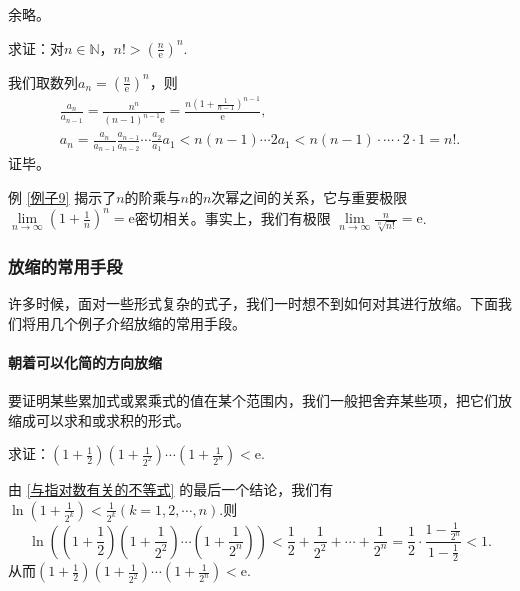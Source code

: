 \begin{itemize}
\begin{prove}
              余略。
          \end{prove}


          \begin{example}
              求证：对$n\in \mathbb{N}$，$n!>\left (\frac{n}{\mathrm e} \right )^n$.\label{例子9}
          \end{example}
          \begin{prove}
              我们取数列$a_n=\left (\frac{n}{\mathrm e} \right )^n$，则
              \begin{gather}
                  \frac{a_n}{a_{n-1}}=\frac{n^n}{(n-1)^{n-1}\mathrm e}=\frac{n\left (1+\frac{1}{n-1}\right )^{n-1}}{\mathrm e},\\
                  a_n=\frac{a_n}{a_{n-1}} \frac{a_{n-1}}{a_{n-2}}\cdots \frac{a_2}{a_1} a_1< n(n-1)\cdots 2a_1<n(n-1)\cdot \cdots \cdot 2\cdot 1=n!.
              \end{gather}
              证毕。
          \end{prove}

          例 \autoref{例子9} 揭示了$n$的阶乘与$n$的$n$次幂之间的关系，它与重要极限$\lim\limits_{n \to \infty}\left (1
              +\frac{1}{n}\right )^n=\mathrm e$密切相关。事实上，我们有极限
          $\lim\limits_{n \to \infty}\frac{n}{\sqrt[n]{n!}}=\mathrm e$.
\end{itemize}

\subsubsection{放缩的常用手段}
\label{sssec:A}
许多时候，面对一些形式复杂的式子，我们一时想不到如何对其进行放缩。下面我们将用几个例子介绍放缩的常用手段。

\paragraph{朝着可以化简的方向放缩}

要证明某些累加式或累乘式的值在某个范围内，我们一般把舍弃某些项，把它们放缩成可以求和或求积的形式。
\begin{example}
    求证：$\left ( 1+\frac{1}{2}\right )\left ( 1+\frac{1}{2^2}\right )
        \cdots \left ( 1+\frac{1}{2^n}\right )<\mathrm{e}$.
\end{example}
\begin{prove}
    由 \eqref{与指对数有关的不等式} 的最后一个结论，我们有$\ln \left ( 1+\frac{1}{2^k}\right )<\frac{1}{2^k}(k=1,2,\cdots,n)$.则
    \[
        \ln\left( \left ( 1+\frac{1}{2}\right )\left ( 1+\frac{1}{2^2}\right )
        \cdots \left ( 1+\frac{1}{2^n}\right ) \right) <\frac{1}{2}+\frac{1}{2^2}
        +\cdots+\frac{1}{2^n}=\frac{1}{2}\cdot \frac{1-\frac{1}{2^n}}{1-\frac{1}{2}}<1
        .\]
    从而$\left ( 1+\frac{1}{2}\right )\left ( 1+\frac{1}{2^2}\right )
        \cdots \left ( 1+\frac{1}{2^n}\right )<\mathrm{e}$.
\end{prove}


